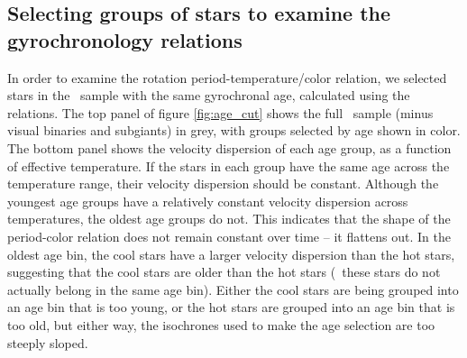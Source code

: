 \subsection{Selecting groups of stars to examine the gyrochronology relations}

In order to examine the rotation period-temperature/color relation, we
selected stars in the \mct\ sample with the same gyrochronal age, calculated
using the \citet{angus2019} relations.
The top panel of figure \ref{fig:age_cut} shows the full \mct\ sample (minus
visual binaries and subgiants) in grey, with groups selected by age shown in
color.
The bottom panel shows the velocity dispersion of each age group, as a
function of effective temperature.
If the stars in each group have the same age across the temperature range,
their velocity dispersion should be constant.
Although the youngest age groups have a relatively constant velocity
dispersion across temperatures, the oldest age groups do not.
This indicates that the shape of the period-color relation does not remain
constant over time -- it flattens out.
In the oldest age bin, the cool stars have a larger velocity dispersion than
the hot stars, suggesting that the cool stars are older than the hot stars
(\ie\ these stars do not actually belong in the same age bin).
Either the cool stars are being grouped into an age bin that is too young, or
the hot stars are grouped into an age bin that is too old, but either way, the
isochrones used to make the age selection are too steeply sloped.
